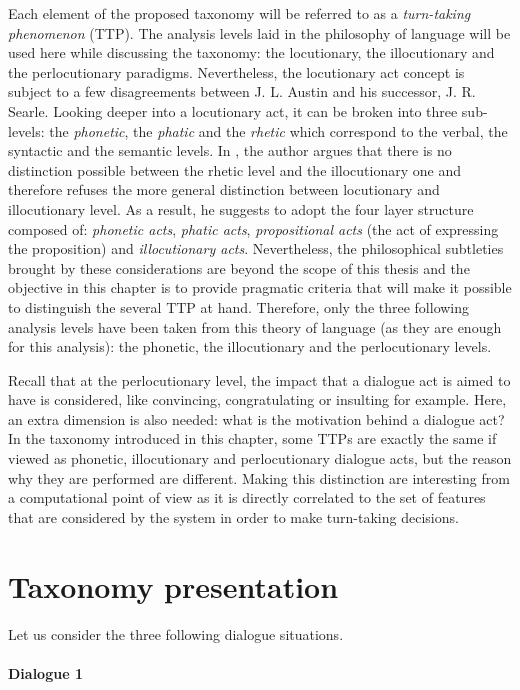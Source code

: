         Each element of the proposed taxonomy will be referred to as a \textit{turn-taking phenomenon} (TTP). The analysis levels laid in the philosophy of language will be used here while discussing the taxonomy: the locutionary, the illocutionary and the perlocutionary paradigms. Nevertheless, the locutionary act concept is subject to a few disagreements between J. L. Austin and his successor, J. R. Searle. Looking deeper into a locutionary act, it can be broken into three sub-levels: the \textit{phonetic}, the \textit{phatic} and the \textit{rhetic} which correspond to the verbal, the syntactic and the semantic levels.  In \cite{Searle1968}, the author argues that there is no distinction possible between the rhetic level and the illocutionary one and therefore refuses the more general distinction between locutionary and illocutionary level. As a result, he suggests to adopt the four layer structure composed of: \textit{phonetic acts}, \textit{phatic acts}, \textit{propositional acts} (the act of expressing the proposition) and \textit{illocutionary acts}. Nevertheless, the philosophical subtleties brought by these considerations are beyond the scope of this thesis and the objective in this chapter is to provide pragmatic criteria that will make it possible to distinguish the several TTP at hand. Therefore, only the three following analysis levels have been taken from this theory of language (as they are enough for this analysis): the phonetic, the illocutionary and the perlocutionary levels.

        Recall that at the perlocutionary level, the impact that a dialogue act is aimed to have is considered, like convincing, congratulating or insulting for example. Here, an extra dimension is also needed: what is the motivation behind a dialogue act? In the taxonomy introduced in this chapter, some TTPs are exactly the same if viewed as phonetic, illocutionary and perlocutionary dialogue acts, but the reason why they are performed are different. Making this distinction are interesting from a computational point of view as it is directly correlated to the set of features that are considered by the system in order to make turn-taking decisions.

\section{Taxonomy presentation}

        Let us consider the three following dialogue situations.

        \paragraph{Dialogue 1}

